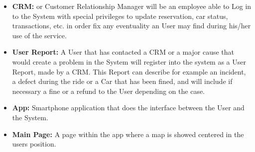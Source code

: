 \documentclass[a4paper]{article}
\begin{document}
\begin{itemize}
\item \textbf{CRM:} or Customer Relationship Manager will be an employee able to Log in to the System with special privileges to update reservation, car status, transactions, etc. in order fix any eventuality an User may find during his/her use of the service.
\item \textbf{User Report:} A User that has contacted a CRM or a major cause that would create a problem in the System will register into the system as a User Report, made by a CRM. This Report can describe for example an incident, a defect during the ride or a Car that has been fined, and will include if necessary a fine or a refund to the User depending on the case.
\item \textbf{App:}  Smartphone application that does the interface between the User and the System.
\item \textbf{Main Page:} A page within the app where a map is showed centered in the users position.
\end{itemize}
\end{document}
